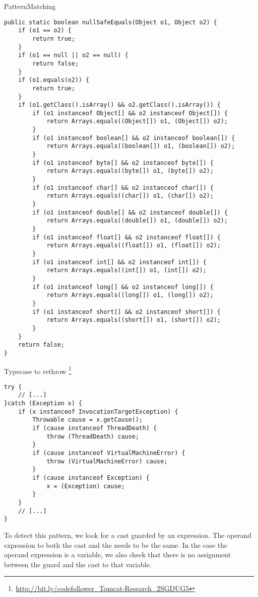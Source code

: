 \begin{pattern}{PatternMatching}
\begin{verbatim}
public static boolean nullSafeEquals(Object o1, Object o2) {
	if (o1 == o2) {
		return true;
	}
	if (o1 == null || o2 == null) {
		return false;
	}
	if (o1.equals(o2)) {
		return true;
	}
	if (o1.getClass().isArray() && o2.getClass().isArray()) {
		if (o1 instanceof Object[] && o2 instanceof Object[]) {
			return Arrays.equals((Object[]) o1, (Object[]) o2);
		}
		if (o1 instanceof boolean[] && o2 instanceof boolean[]) {
			return Arrays.equals((boolean[]) o1, (boolean[]) o2);
		}
		if (o1 instanceof byte[] && o2 instanceof byte[]) {
			return Arrays.equals((byte[]) o1, (byte[]) o2);
		}
		if (o1 instanceof char[] && o2 instanceof char[]) {
			return Arrays.equals((char[]) o1, (char[]) o2);
		}
		if (o1 instanceof double[] && o2 instanceof double[]) {
			return Arrays.equals((double[]) o1, (double[]) o2);
		}
		if (o1 instanceof float[] && o2 instanceof float[]) {
			return Arrays.equals((float[]) o1, (float[]) o2);
		}
		if (o1 instanceof int[] && o2 instanceof int[]) {
			return Arrays.equals((int[]) o1, (int[]) o2);
		}
		if (o1 instanceof long[] && o2 instanceof long[]) {
			return Arrays.equals((long[]) o1, (long[]) o2);
		}
		if (o1 instanceof short[] && o2 instanceof short[]) {
			return Arrays.equals((short[]) o1, (short[]) o2);
		}
	}
	return false;
}
\end{verbatim}

Typecase to rethrow
\footnote{\url{http://bit.ly/codefollower_Tomcat-Research_2SGDUG5}}

\begin{verbatim}
try {
	// [...]
}catch (Exception x) {
	if (x instanceof InvocationTargetException) {
		Throwable cause = x.getCause();
		if (cause instanceof ThreadDeath) {
			throw (ThreadDeath) cause;
		}
		if (cause instanceof VirtualMachineError) {
			throw (VirtualMachineError) cause;
		}
		if (cause instanceof Exception) {
			x = (Exception) cause;
		}
	}
	// [...]
}
\end{verbatim}

\detection{}
To detect this pattern, we look for a cast guarded by an  expression.
The operand expression to both the cast and the  needs to be the same.
In the case the operand expression is a variable, we also check that there is no assignment between the  guard and the cast to that variable.


\end{pattern}
